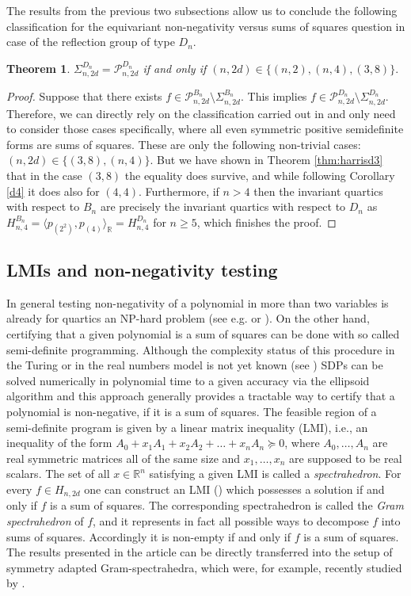 \documentclass[11pt,a4paper]{amsart}
\numberwithin{equation}{section}
\newtheorem{thm}{Theorem}
\theoremstyle{definition}
\newcommand{\R}{\mathbb{R}}
\numberwithin{thm}{section}
\theoremstyle{break}
\numberwithin{subcase}{case}
\begin{document}
The results from the previous two subsections allow us to conclude the following classification for the equivariant non-negativity versus sums of squares question in case of the reflection group of type $D_n$. 
\begin{thm}\label{thm:chardn}
$\Sigma_{n,2d}^{D_n} = \mathcal{P}_{n,2d}^{D_n}$ if and only if $(n,2d) \in \{ (n,2), (n,4) , (3,8)\}.$
\end{thm}
\begin{proof}
Suppose that there exists $f\in \mathcal{P}_{n,2d}^{B_n}\setminus \Sigma_{n,2d}^{B_n}$. This implies $f\in \mathcal{P}_{n,2d}^{D_n}\setminus \Sigma_{n,2d}^{D_n}$.
Therefore, we can directly rely on the classification carried out in \cite{goel2017analogue} and only need to consider those cases specifically, where all even symmetric positive semidefinite forms are sums of squares. These  are only the following non-trivial cases: $(n,2d) \in \{ (3,8), (n,4) \}$. But we have shown in Theorem \ref{thm:harrisd3} that in the case  $(3,8)$ the equality does survive, and while following Corollary \ref{d4} it does also for $(4,4)$. Furthermore, if $n > 4$ then the invariant quartics with respect to $B_n$ are precisely the invariant quartics with respect to $D_n$ as $H_{n,4}^{B_n} = \langle p_{(2^2)}, p_{(4)}\rangle_\R = H_{n,4}^{D_n}$ for $n \geq 5$, which finishes the proof.
\end{proof}

\subsection{LMIs and non-negativity testing}

In general testing non-negativity of a polynomial in more than two variables is already for quartics an NP-hard problem (see e.g. \cite{blum1998complexity} or \cite{murty1985some}). On the other hand, certifying that a given polynomial is a sum of squares can be done with so called semi-definite programming. Although the complexity status of this procedure in the Turing or in the real numbers model is not yet known (see \cite{complexsdp}) SDPs can be solved numerically in polynomial time to a given accuracy via the ellipsoid algorithm and  
this approach generally provides a tractable way to certify that a polynomial is non-negative, if it is a sum of squares. The feasible region of a semi-definite program is given by a linear matrix inequality (LMI), i.e., an inequality of the form $A_0+x_1A_1+x_2A_2+\ldots+x_nA_n\succeq 0$,
where $A_0,\ldots, A_{n}$ are real symmetric matrices all of the same size and $x_1,\ldots,x_n$ are supposed to be real scalars. The set of all $x\in\R^n$ satisfying a given LMI is called a \emph{spectrahedron}. For every $f\in H_{n,2d}$ one can construct an LMI (\cite{powers1998algorithm}) which possesses a solution if and only if $f$ is a sum of squares. The corresponding spectrahedron is called the \emph{Gram spectrahedron}  of $f$\cite{chua2016gram}, and it represents in fact all possible ways to decompose $f$ into sums of squares. Accordingly it is non-empty if and only if $f$ is a sum of squares.  The results presented in the article can be directly transferred into the setup of symmetry adapted Gram-spectrahedra, which were, for example, recently studied by \cite{shankar}. 
\end{document}
